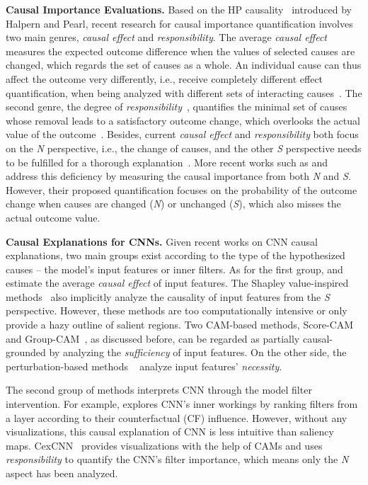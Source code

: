 \noindent\textbf{Causal Importance Evaluations.}
\label{subsec:current_res}
Based on the HP causality~\cite{pearl2009causality, halpern2020causes} introduced by Halpern and Pearl, recent research for causal importance quantification involves two main genres, \textit{causal effect} and \textit{responsibility}.
The average \textit{causal effect}~\cite{glymour2016causal} measures the expected outcome difference when the values of selected causes are changed, which regards the set of causes as a whole.
An individual cause can thus affect the outcome very differently, i.e., receive completely different effect quantification, when being analyzed with different sets of interacting causes~\cite{yao2021survey}.
The second genre, the degree of \textit{responsibility}~\cite{chockler2004responsibility}, quantifies the minimal set of causes whose removal leads to a satisfactory outcome change, which overlooks the actual value of the outcome~\cite{lagnado2013causal,baier2021verification}.
Besides, current \textit{causal effect} and \textit{responsibility} both focus on the \textit{N} perspective, i.e., the change of causes, and the other \textit{S} perspective needs to be fulfilled for a thorough explanation~\cite{lipton1990contrastive,woodward2006sensitive,grinfeld2020causal,watson2021local}.
More recent works such as \cite{watson2021local} and \cite{kommiya2021towards} address this deficiency by measuring the causal importance from both \textit{N} and \textit{S}.
However, their proposed quantification focuses on the probability of the outcome change when causes are changed (\textit{N}) or unchanged (\textit{S}), which also misses the actual outcome value.

\noindent\textbf{Causal Explanations for CNNs.}
Given recent works on CNN causal explanations, two main groups exist according to the type of the hypothesized causes -- the model's input features or inner filters.
As for the first group, \cite{chattopadhyay2019neural} and \cite{harradon2018causal} estimate the average \textit{causal effect} of input features.
The Shapley value-inspired methods~\cite{vstrumbelj2014explaining,datta2016algorithmic,lundberg2017unified,sundararajan2020many,aas2021explaining}  also implicitly analyze the causality of input features from the \textit{S} perspective. However, these methods are too computationally intensive or only provide a hazy outline of salient regions.
Two CAM-based methods, Score-CAM~\cite{wang2019score} and Group-CAM~\cite{zhang2021group}, as discussed before, can be regarded as partially causal-grounded by analyzing the \textit{sufficiency} of input features.
On the other side, the perturbation-based methods ~\cite{zeiler2014visualizing,ribeiro2016should,petsiuk2018rise} analyze input features' \textit{necessity}.

The second group of methods interprets CNN through the model filter intervention.
For example, \cite{narendra2018explaining} explores CNN's inner workings by ranking filters from a layer according to their counterfactual (CF) influence.
However, without any visualizations, this causal explanation of CNN is less intuitive than saliency maps.
CexCNN~\cite{debbi2021causal} provides visualizations with the help of CAMs and uses \textit{responsibility} to quantify the CNN's filter importance, which means only the \textit{N} aspect has been analyzed.
